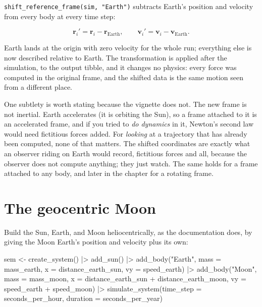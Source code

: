 \documentclass[
  10.5pt,
  letterpaper,
]{scrbook}
\newenvironment{Shaded}{\begin{snugshade}}{\end{snugshade}}
\newcommand{\AttributeTok}[1]{\textcolor[rgb]{0.00,0.00,0.00}{#1}}
\newcommand{\FunctionTok}[1]{\textcolor[rgb]{0.00,0.00,0.00}{#1}}
\newcommand{\NormalTok}[1]{\textcolor[rgb]{0.00,0.00,0.00}{#1}}
\newcommand{\OtherTok}[1]{\textcolor[rgb]{0.00,0.00,0.00}{#1}}
\newcommand{\SpecialCharTok}[1]{\textcolor[rgb]{0.00,0.00,0.00}{#1}}
\newcommand{\StringTok}[1]{\textcolor[rgb]{0.00,0.00,0.00}{#1}}
\newcounter{none} %
\theoremstyle{plain}
\theoremstyle{remark}
\begin{document}
\texttt{shift\_reference\_frame(sim,\ "Earth")} subtracts Earth's
position and velocity from every body at every time step:

\[
\mathbf{r}_i' = \mathbf{r}_i - \mathbf{r}_{\mathrm{Earth}}, \qquad
\mathbf{v}_i' = \mathbf{v}_i - \mathbf{v}_{\mathrm{Earth}}.
\]

Earth lands at the origin with zero velocity for the whole run;
everything else is now described relative to Earth. The transformation
is applied after the simulation, to the output tibble, and it changes no
physics: every force was computed in the original frame, and the shifted
data is the same motion seen from a different place.

One subtlety is worth stating because the vignette does not. The new
frame is not inertial. Earth accelerates (it is orbiting the Sun), so a
frame attached to it is an accelerated frame, and if you tried to
\emph{do dynamics} in it, Newton's second law would need fictitious
forces added. For \emph{looking} at a trajectory that has already been
computed, none of that matters. The shifted coordinates are exactly what
an observer riding on Earth would record, fictitious forces and all,
because the observer does not compute anything; they just watch. The
same holds for a frame attached to any body, and later in the chapter
for a rotating frame.

\section{The geocentric Moon}\label{the-geocentric-moon}

Build the Sun, Earth, and Moon heliocentrically, as the documentation
does, by giving the Moon Earth's position and velocity plus its own:

\begin{Shaded}
\begin{Highlighting}[]
\NormalTok{sem }\OtherTok{\textless{}{-}} \FunctionTok{create\_system}\NormalTok{() }\SpecialCharTok{|\textgreater{}}
  \FunctionTok{add\_sun}\NormalTok{() }\SpecialCharTok{|\textgreater{}}
  \FunctionTok{add\_body}\NormalTok{(}\StringTok{"Earth"}\NormalTok{, }\AttributeTok{mass =}\NormalTok{ mass\_earth, }\AttributeTok{x =}\NormalTok{ distance\_earth\_sun, }\AttributeTok{vy =}\NormalTok{ speed\_earth) }\SpecialCharTok{|\textgreater{}}
  \FunctionTok{add\_body}\NormalTok{(}\StringTok{"Moon"}\NormalTok{,  }\AttributeTok{mass =}\NormalTok{ mass\_moon,}
           \AttributeTok{x =}\NormalTok{ distance\_earth\_sun }\SpecialCharTok{+}\NormalTok{ distance\_earth\_moon,}
           \AttributeTok{vy =}\NormalTok{ speed\_earth }\SpecialCharTok{+}\NormalTok{ speed\_moon) }\SpecialCharTok{|\textgreater{}}
  \FunctionTok{simulate\_system}\NormalTok{(}\AttributeTok{time\_step =}\NormalTok{ seconds\_per\_hour, }\AttributeTok{duration =}\NormalTok{ seconds\_per\_year)}
\end{Highlighting}
\end{Shaded}
\end{document}

